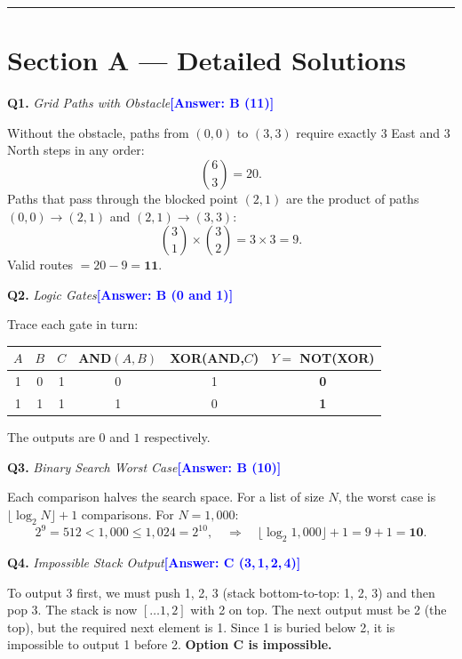\documentclass[a4paper,12pt]{article}
\newcommand{\ans}[1]{\textcolor{blue}{\textbf{[Answer: #1]}}}
\newcommand{\qsol}[3]{%
  \vspace{1.5ex}%
  \noindent\textbf{Q#1.} \textit{#2}\quad\ans{#3}%
  \par\vspace{0.4ex}%
}
\begin{document}
\vspace{1ex}\hrule\vspace{2ex}

\section*{Section A --- Detailed Solutions}

\qsol{1}{Grid Paths with Obstacle}{B (11)}

Without the obstacle, paths from $(0,0)$ to $(3,3)$ require exactly 3 East
and 3 North steps in any order:
\[
  \binom{6}{3} = 20.
\]
Paths that pass through the blocked point $(2,1)$ are the product of paths
$(0,0)\!\to\!(2,1)$ and $(2,1)\!\to\!(3,3)$:
\[
  \binom{3}{1} \times \binom{3}{2} = 3 \times 3 = 9.
\]
Valid routes $= 20 - 9 = \mathbf{11}$.

\qsol{2}{Logic Gates}{B (0 and 1)}

Trace each gate in turn:

\medskip
\begin{center}
\begin{tabular}{ccc|c|c|c}
  \toprule
  $A$ & $B$ & $C$ & AND$(A,B)$ & XOR(AND,$C$) & $Y=$ NOT(XOR) \\
  \midrule
  1 & 0 & 1 & 0 & 1 & \textbf{0} \\
  1 & 1 & 1 & 1 & 0 & \textbf{1} \\
  \bottomrule
\end{tabular}
\end{center}
\medskip

The outputs are $0$ and $1$ respectively.

\qsol{3}{Binary Search Worst Case}{B (10)}

Each comparison halves the search space. For a list of size $N$, the worst
case is $\lfloor\log_2 N\rfloor + 1$ comparisons. For $N = 1{,}000$:
\[
  2^9 = 512 < 1{,}000 \le 1{,}024 = 2^{10},
  \quad\Rightarrow\quad
  \lfloor\log_2 1{,}000\rfloor + 1 = 9 + 1 = \mathbf{10}.
\]

\qsol{4}{Impossible Stack Output}{C (3,\,1,\,2,\,4)}

To output 3 first, we must push 1, 2, 3 (stack bottom-to-top: 1, 2, 3) and
then pop 3. The stack is now $[\ldots 1, 2]$ with 2 on top. The next output
must be 2 (the top), but the required next element is 1. Since 1 is buried
below 2, it is impossible to output 1 before 2.
\textbf{Option C is impossible.}
\end{document}

